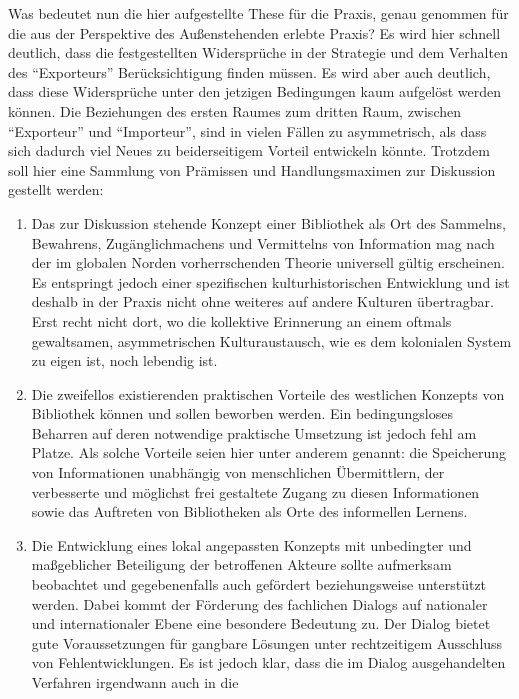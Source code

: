 \documentclass[a4paper,
fontsize=11pt,
oneside,
numbers=noperiodatend,
parskip=half-,
bibliography=totoc,
final
]{scrartcl}
\begin{document}
Was bedeutet nun die hier aufgestellte These für die Praxis, genau
genommen für die aus der Perspektive des Außenstehenden erlebte Praxis?
Es wird hier schnell deutlich, dass die festgestellten Widersprüche in
der Strategie und dem Verhalten des \enquote{Exporteurs}
Berücksichtigung finden müssen. Es wird aber auch deutlich, dass diese
Widersprüche unter den jetzigen Bedingungen kaum aufgelöst werden
können. Die Beziehungen des ersten Raumes zum dritten Raum, zwischen
\enquote{Exporteur} und \enquote{Importeur}, sind in vielen Fällen zu
asymmetrisch, als dass sich dadurch viel Neues zu beiderseitigem Vorteil
entwickeln könnte. Trotzdem soll hier eine Sammlung von Prämissen und
Handlungsmaximen zur Diskussion gestellt werden:

\begin{enumerate}
\def\labelenumi{\arabic{enumi}.}
\item
  Das zur Diskussion stehende Konzept einer Bibliothek als Ort des
  Sammelns, Bewahrens, Zugänglichmachens und Vermittelns von Information
  mag nach der im globalen Norden vorherrschenden Theorie universell
  gültig erscheinen. Es entspringt jedoch einer spezifischen
  kulturhistorischen Entwicklung und ist deshalb in der Praxis nicht
  ohne weiteres auf andere Kulturen übertragbar. Erst recht nicht dort,
  wo die kollektive Erinnerung an einem oftmals gewaltsamen,
  asymmetrischen Kulturaustausch, wie es dem kolonialen System zu eigen
  ist, noch lebendig ist.
\item
  Die zweifellos existierenden praktischen Vorteile des westlichen
  Konzepts von Bibliothek können und sollen beworben werden. Ein
  bedingungsloses Beharren auf deren notwendige praktische Umsetzung ist
  jedoch fehl am Platze. Als solche Vorteile seien hier unter anderem
  genannt: die Speicherung von Informationen unabhängig von menschlichen
  Übermittlern, der verbesserte und möglichst frei gestaltete Zugang zu
  diesen Informationen sowie das Auftreten von Bibliotheken als Orte des
  informellen Lernens.
\item
  Die Entwicklung eines lokal angepassten Konzepts mit unbedingter und
  maßgeblicher Beteiligung der betroffenen Akteure sollte aufmerksam
  beobachtet und gegebenenfalls auch gefördert beziehungsweise
  unterstützt werden. Dabei kommt der Förderung des fachlichen Dialogs
  auf nationaler und internationaler Ebene eine besondere Bedeutung zu.
  Der Dialog bietet gute Voraussetzungen für gangbare Lösungen unter
  rechtzeitigem Ausschluss von Fehlentwicklungen. Es ist jedoch klar,
  dass die im Dialog ausgehandelten Verfahren irgendwann auch in die

\end{enumerate}
\end{document}
